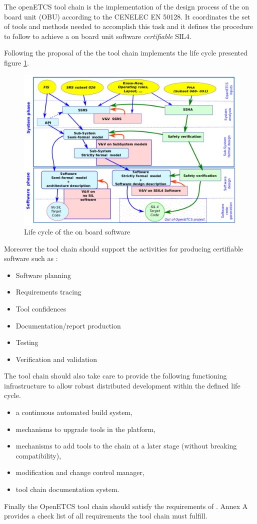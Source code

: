 
The openETCS tool chain is the implementation of the design process of
the on board unit  (\gls{OBU}) according to the CENELEC EN 50128.
It coordinates the set of tools and methods needed to accomplish this
task and it defines the procedure to follow  to achieve a on board
unit software {\em certifiable} \gls{SIL}4.

Following the proposal of the \cite{D2.3} the tool chain implements
the  life cycle presented figure \ref{fig:lifecycle}.
\begin{figure}
\includegraphics[width=\textwidth]{WholeProcess}
\caption{\label{fig:lifecycle} Life cycle of the on board software}
\end{figure}

Moreover the tool chain should support the activities for producing
certifiable software such as :
\begin{itemize}
\item Software planning
\item Requirements tracing
\item Tool confidences 
\item Documentation/report production
\item Testing 
\item Verification and validation
\end{itemize}

The tool chain should also take care to provide the following
functioning infrastructure to allow robust distributed development
within the defined life cycle. 
\begin{itemize}
\item a continuous automated build system,
\item  mechanisms to upgrade tools in the platform,
\item  mechanisms to add tools to the chain at a later stage (without
  breaking compatibility),
\item modification and change control manager,
\item  tool chain documentation system.
\end{itemize}

Finally the OpenETCS tool chain  should satisfy the requirements of
\cite{D2.6}. Annex A provides a check list of all requirements the
tool chain must fulfill.


